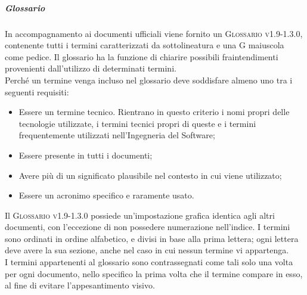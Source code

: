 \documentclass[../norme-di-progetto.tex]{subfiles}
\begin{document}
\subparagraph*{Glossario}
In accompagnamento ai documenti ufficiali viene fornito un \textsc{Glossario v1.9-1.3.0}, contenente tutti i termini caratterizzati da sottolineatura e una G maiuscola come pedice. Il glossario ha la funzione di chiarire possibili fraintendimenti provenienti dall'utilizzo di determinati termini. \\
Perché un termine venga incluso nel glossario deve soddisfare almeno uno tra i seguenti requisiti:
\begin{itemize}
  \item Essere un termine tecnico. Rientrano in questo criterio i nomi propri delle tecnologie utilizzate, i termini tecnici propri di queste e i termini frequentemente utilizzati nell'Ingegneria del Software;
  \item Essere presente in tutti i documenti;
  \item Avere più di un significato plausibile nel contesto in cui viene utilizzato;
  \item Essere un acronimo specifico e raramente usato.
\end{itemize}
Il \textsc{Glossario v1.9-1.3.0} possiede un'impostazione grafica identica agli altri documenti, con l'eccezione di non possedere numerazione nell'indice. I termini sono ordinati in ordine alfabetico, e divisi in base alla prima lettera; ogni lettera deve avere la sua sezione, anche nel caso in cui nessun termine vi appartenga. \\
I termini appartenenti al glossario sono contrassegnati come tali solo una volta per ogni documento, nello specifico la prima volta che il termine compare in esso, al fine di evitare l'appesantimento visivo.
\end{document}
